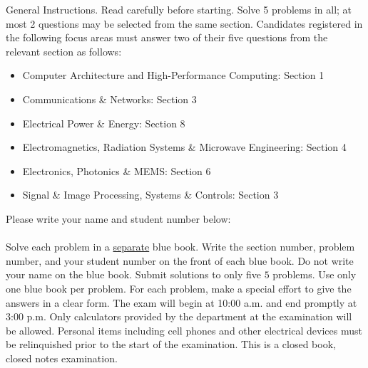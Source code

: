 \documentclass[main.tex]{subfiles}
\begin{document}
General Instructions. Read carefully before starting. Solve 5 problems in all; at most 2 questions may be selected from the same section. Candidates registered in the following focus areas must answer two of their five questions from the relevant section as follows:\\

\begin{itemize}
    \item Computer Architecture and High-Performance Computing: Section 1
    \item Communications \& Networks: Section 3
    \item Electrical Power \& Energy: Section 8
    \item Electromagnetics, Radiation Systems \& Microwave Engineering: Section 4
    \item Electronics, Photonics \& MEMS: Section 6
    \item Signal \& Image Processing, Systems \& Controls: Section 3
\end{itemize}

Please write your name and student number below:\\\\

Solve each problem in a \underline{separate} blue book. Write the section number, problem number, and your student number on the front of each blue book. Do not write your name on the blue book. Submit solutions to only five \(5\) problems. Use only one blue book per problem. For each problem, make a special effort to give the answers in a clear form. The exam will begin at 10:00 a.m. and end promptly at 3:00 p.m. Only calculators provided by the department at the examination will be allowed. Personal items including cell phones and other electrical devices must be relinquished prior to the start of the examination. This is a closed book, closed notes examination.
\end{document}
